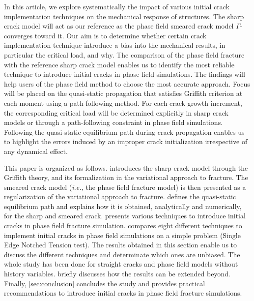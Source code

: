 \documentclass[OptSoft]{jtcam_preprint}
\begin{document}
In this article, we explore systematically the impact of various initial crack implementation techniques on the mechanical response of structures.
The sharp crack model will act as our reference as the phase field smeared crack model $\Gamma$-converges toward it.
Our aim is to determine whether certain crack implementation technique introduce a bias into the mechanical results, in particular the critical load, and why.
The comparison of the phase field fracture with the reference sharp crack model enables us to identify the most reliable technique to introduce initial cracks in phase field simulations.
The findings will help users of the phase field method to choose the most accurate approach.
Focus will be placed on the quasi-static propagation that satisfies Griffith criterion at each moment using a path-following method.
For each crack growth increment, the corresponding critical load will be determined explicitly in sharp crack models or through a path-following constraint in phase field simulations.
Following the quasi-static equilibrium path during crack propagation enables us to highlight the errors induced by an improper crack initialization irrespective of any dynamical effect.

This paper is organized as follows.
 introduces the sharp crack model through the Griffith theory, and its formalization in the variational approach to fracture.
The smeared crack model (\emph{i.e.,} the phase field fracture model) is then presented as a regularization of the variational approach to fracture.
 defines the quasi-static equilibrium path and explains how it is obtained, analytically and numerically, for the sharp and smeared crack.
 presents various techniques to introduce initial cracks in phase field fracture simulation.
 compares eight different techniques to implement initial cracks in phase field simulations on a simple problem (Single Edge Notched Tension test).
The results obtained in this section enable us to discuss the different techniques and determinate which ones are unbiased.
The whole study has been done for straight cracks and phase field models without history variables.
 briefly discusses  how the results can be extended beyond.
Finally, \cref{sec:conclusion} concludes the study and provides practical recommendations to introduce initial cracks in phase field fracture simulations.
\end{document}

